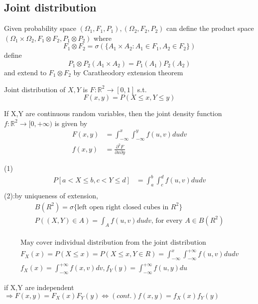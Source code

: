 \subsection{Joint distribution}
Given probability space $ (\Omega_1, F_1, P_1), (\Omega_2, F_2, P_2)$ can define the product space $ (\Omega_1\times\Omega_2, F_1\otimes F_2, P_1\otimes P_2) $ where$$
    F_1\otimes F_2=\sigma(\{A_1\times A_2:A_1\in F_1,A_2\in F_2\})
$$  define $$
    P_1\otimes P_2(A_1\times A_2)=P_1(A_1)P_2(A_2)
$$ and extend to $ F_1\otimes F_2 $ by Caratheodory extension theorem
\begin{definition}{}
    Joint distribution of $ X,Y $ is $ F:\mathbb{R}^2\rightarrow[0,1] $ s.t.  $$
        F(x,y)=P(X\leq x,Y\leq y)
    $$
\end{definition}
\begin{definition}[]{}
If  X,Y are continuous random variables, then the joint density function $ f:\mathbb{R}^2\rightarrow[0,+\infty) $ is given by\begin{align*}{}{}
F(x,y)&=\int_{-\infty}^{x}\int_{-\infty}^{y}f(u,v)dudv\\
f(x,y)&=\frac{\partial^2 F}{\partial x\partial y}
\end{align*} 
\end{definition}
\begin{remark}[]{}
(1)
\begin{align*}{}{}
P[a< X\leq b,c<Y\leq d]&=\int_{a}^{b}\int_{c}^{d}f(u,v)dudv\\
\end{align*}
(2):by uniqueness of extension,\begin{align*}{}{}
B(R^2)=\sigma\{\text{left open right closed cubes in } R^2\}\\
P((X,Y)\in A)=\int_{A}f(u,v)dudv\text{, for every } A\in B(R^2)\\
\end{align*}
\end{remark}
\begin{align*}{}{}
    \text{May cover individual distribution from the joint distribution}\\
    F_X(x)=P(X\leq x)=P(X\leq x,Y\in R)=\int_{-\infty}^{x}\int_{-\infty}^{+\infty}f(u,v)dudv\\
    f_X(x)=\int_{-\infty}^{+\infty}f(x,v)dv,f_Y(y)=\int_{-\infty}^{+\infty}f(u,y)du
\end{align*}
\begin{remark}[]{}
if X,Y are independent$\Rightarrow F(x,y)=F_X(x)F_Y(y)\Leftrightarrow(cont.) f(x,y)=f_X(x)f_Y(y) $
\end{remark}
